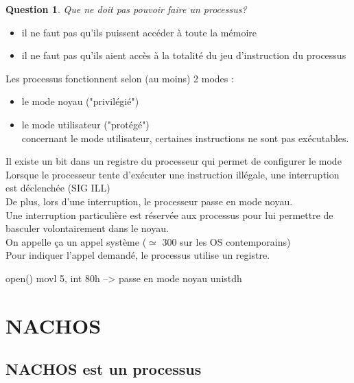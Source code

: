 \documentclass[12pt,a4paper]{report}
\newtheorem*{q}{Question}
\begin{document}
\medskip
\begin{q}Que ne doit pas pouvoir faire un processus?\end{q}
\begin{itemize}
\item il ne faut pas qu'ils puissent accéder à toute la mémoire
\item il ne faut pas qu'ils aient accès à la totalité du jeu d'instruction du processus\\
\end{itemize}

\bigskip

Les processus fonctionnent selon (au moins) 2 modes :
\begin{itemize}
\item le mode noyau ("privilégié")
\item le mode utilisateur ("protégé")\\
concernant le mode utilisateur, certaines instructions ne sont pas exécutables.
\end{itemize}
Il existe un bit dans un registre du processeur qui permet de configurer le mode\\

Lorsque le processeur tente d'exécuter une instruction illégale, une interruption est déclenchée (SIG ILL)\\
De plus, lors d'une interruption, le processeur passe en mode noyau.\\
Une interruption particulière est réservée aux processus pour lui permettre de basculer volontairement dans le noyau.\\
On appelle ça un appel système ($\simeq$ 300 sur les OS contemporains)\\

Pour indiquer l'appel demandé, le processus utilise un registre.
\medskip
\begin{verbatimtab}
open()
{
 movl 5, %
 int 80h      --> passe en mode noyau
}
 unistdh
\end{verbatimtab}



\chapter{NACHOS}
\section{NACHOS est un processus}
\end{document}
